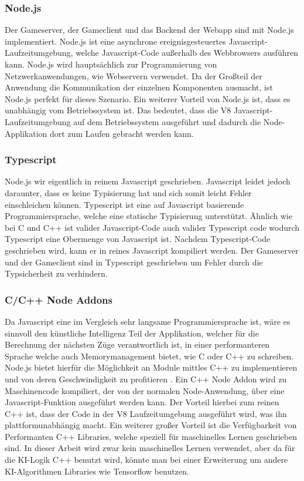 \documentclass[12pt,a4paper,bibliography=totocnumbered,listof=totocnumbered]{article}
\begin{document}
\subsubsection{Node.js}
Der Gameserver, der Gameclient und das Backend der Webapp sind mit Node.js implementiert. 
Node.js ist eine asynchrone ereignisgesteuertes Javascript-Laufzeitumgebung, welche Javascript-Code außerhalb des Webbrowsers ausführen kann.
Node.js wird hauptsächlich zur Programmierung von Netzwerkanwendungen, wie Webservern verwendet. Da der Großteil der Anwendung die
Kommunikation der einzelnen Komponenten ausmacht, ist Node.js perfekt für dieses Szenario. 
Ein weiterer Vorteil von Node.js ist, dass es unabhängig vom Betriebssystem ist. Das bedeutet, dass die V8 Javascript-Laufzeitumgebung
auf dem Betriebssystem ausgeführt und dadurch die Node-Applikation dort zum Laufen gebracht werden kann.
\cite{Node}

\subsubsection{Typescript}
Node.js wir eigentlich in reinem Javascript geschrieben. Javascript leidet jedoch daraunter, dass es keine Typisierung hat und sich somit leicht Fehler 
einschleichen können. Typescript ist eine auf Javascript basierende Programmiersprache, welche eine statische Typisierung unterstützt. 
Ähnlich wie bei C und C++ ist valider Javascript-Code auch valider Typescript code wodurch Typescript eine Obermenge von Javascript ist.
Nachdem Typescript-Code geschrieben wird, kann er in reines Javascript kompiliert werden.
Der Gameserver und der Gameclient sind in Typescript geschrieben um Fehler durch die Typsicherheit zu verhindern. 

\subsubsection{C/C++ Node Addons}
Da Javascript eine im Vergleich sehr langsame Programmiersprache ist, wäre es sinnvoll den künstliche Intelligenz Teil der Applikation, welcher für die 
Berechnung der nächsten Züge verantwortlich ist, in einer performanteren Sprache welche auch Memorymanagement bietet, wie C oder C++ zu schreiben. 
Node.js bietet hierfür die Möglichkeit an
Module mittles C++ zu implementieren und von deren Geschwindigkeit zu profitieren \cite{NodeC++Performance}. Ein C++ Node Addon wird zu Maschinencode kompiliert, der von der
normalen Node-Anwendung, über eine Javascript-Funktion ausgeführt werden kann. Der Vorteil hierbei zum reinen C++ ist, dass der Code in der V8 
Laufzeitumgebung ausgeführt wird, was ihn plattformunabhängig macht. \cite{C++Node}
Ein weiterer großer Vorteil ist die Verfügbarkeit von Performanten C++ Libraries, welche speziell für maschinelles Lernen geschrieben sind. 
In dieser Arbeit wird zwar kein maschinelles Lernen verwendet, aber da für die KI-Logik C++ benutzt wird, könnte man bei einer Erweiterung 
um andere KI-Algorithmen Libraries wie Tensorflow benutzen.
\end{document}
